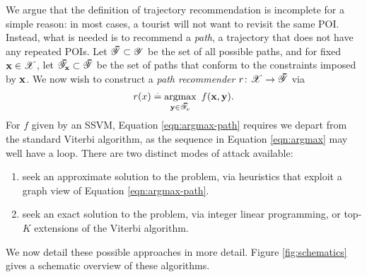 We argue that the definition of trajectory recommendation is incomplete for a simple reason:
in most cases, a tourist will not want to revisit the same POI.
Instead, what is needed is to recommend a \emph{path}, \ie a trajectory that does not have any repeated POIs.
Let $\thickbar{\YCal} \subset \YCal$ be the set of all possible paths,
and for fixed $\mathbf{x} \in \mathscr{X}$, let $\thickbar{\YCal}_{\x} \subset \thickbar{\YCal}$ be the set of paths that conform to the constraints imposed by $\mathbf{x}$.
We now wish to construct a \emph{path recommender} $r \colon \XCal \to \thickbar{\YCal}$ via
\begin{equation}
	\label{eqn:argmax-path}
	r( x ) \defEq \argmax_{\y \in \thickbar{\YCal}_x}~f(\x, \y).
\end{equation}
For $f$ given by an SSVM, Equation \ref{eqn:argmax-path} requires we depart from the standard Viterbi algorithm, as the sequence in Equation \ref{eqn:argmax} may well have a loop.
There are two distinct modes of attack available:
\begin{enumerate}
	\item seek an approximate solution to the problem,
	via heuristics that exploit a graph view of Equation \ref{eqn:argmax-path}.

	\item seek an exact solution to the problem,
	via integer linear programming,
	or top-$K$ extensions of the Viterbi algorithm. %
\end{enumerate}
We now detail these possible approaches in more detail.
Figure \ref{fig:schematics} gives a schematic overview of these algorithms.


